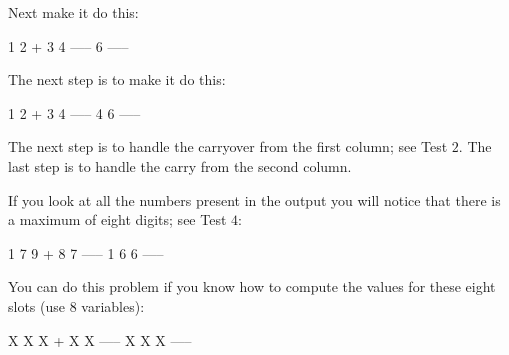 Next make it do this:
\begin{console}[commandchars=\\\{\}]
  1 2
+ 3 4
-----
    6
-----
\end{console}

The next step is to make it do this:
\begin{console}[commandchars=\\\{\}]
  1 2
+ 3 4
-----
  4 6
-----
\end{console}

The next step is to handle the carryover from the first column; see Test $2$.
The last step is to handle the carry from the second column.

If you look at all the numbers present in the output you will notice that there
is a maximum of eight digits; see Test $4$:
\begin{console}[commandchars=\\\{\}]
  1
  7 9
+ 8 7
-----
1 6 6
-----
\end{console}

You can do this problem if you know how to compute the values for these eight 
slots (use $8$ variables):
\begin{console}[commandchars=\\\{\}]
  X
  X X
+ X X
-----
X X X
-----
\end{console}
